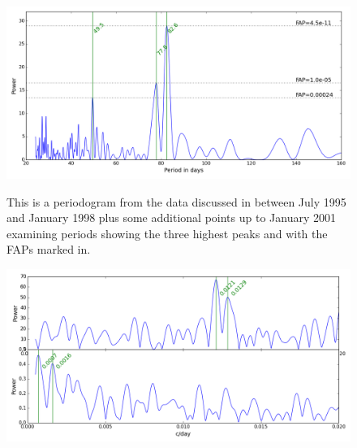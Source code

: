 \begin{figure}[!htbp]
\begin{center}
\includegraphics[scale=0.40]{Figures/hstb4min.png} \\
\end{center}
\caption{This is a periodogram  from the {\hst} data discussed in \citet{benedict98} between July 1995 and
  January 1998 plus some additional points up to January 2001 examining periods showing the three highest peaks and with
  the FAPs marked in. }
\protect\label{fig:hstb4min}
\end{figure}

\begin{figure}[!htbp]
\begin{center}
\includegraphics[scale=0.40]{Figures/hstwf2.png} \\
\end{center}
\caption{}
\protect\label{fig:hstwf}
\end{figure}


